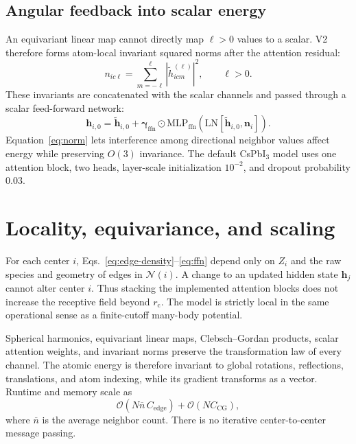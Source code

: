 \documentclass[10pt]{article}
\newcommand{\calN}{\mathcal{N}}
\newcommand{\vect}[1]{\bm{#1}}
\begin{document}
\subsection{Angular feedback into scalar energy}

An equivariant linear map cannot directly map $\ell>0$ values to a scalar.
V2 therefore forms atom-local invariant squared norms after the attention
residual:
\begin{equation}
 n_{ic\ell}=\sum_{m=-\ell}^{\ell}
 \left|\widetilde h^{(\ell)}_{icm}\right|^2,
 \qquad \ell>0.
 \label{eq:norm}
\end{equation}
These invariants are concatenated with the scalar channels and passed through a
scalar feed-forward network:
\begin{equation}
 \vect h_{i,0}=\widetilde{\vect h}_{i,0}
 +\vect\gamma_{\mathrm{ffn}}\odot
 \mathrm{MLP}_{\mathrm{ffn}}
 \!\left(\mathrm{LN}[\widetilde{\vect h}_{i,0},\vect n_i]\right).
 \label{eq:ffn}
\end{equation}
Equation~\eqref{eq:norm} lets interference among directional neighbor values
affect energy while preserving $O(3)$ invariance. The default CsPbI$_3$ model
uses one attention block, two heads, layer-scale initialization $10^{-2}$, and
dropout probability $0.03$.

\section{Locality, equivariance, and scaling}

For each center $i$, Eqs.~\eqref{eq:edge-density}--\eqref{eq:ffn} depend only on
$Z_i$ and the raw species and geometry of edges in $\calN(i)$. A change to an
updated hidden state $\vect h_j$ cannot alter center $i$. Thus stacking the
implemented attention blocks does not increase the receptive field beyond
$r_{\mathrm c}$. The model is strictly local in the same operational sense as a
finite-cutoff many-body potential.

Spherical harmonics, equivariant linear maps, Clebsch--Gordan products, scalar
attention weights, and invariant norms preserve the transformation law of every
channel. The atomic energy is therefore invariant to global rotations,
reflections, translations, and atom indexing, while its gradient transforms as
a vector. Runtime and memory scale as
\begin{equation}
 \mathcal O(N\overline n\,C_{\mathrm{edge}})+\mathcal O(NC_{\mathrm{CG}}),
\end{equation}
where $\overline n$ is the average neighbor count. There is no iterative
center-to-center message passing.
\end{document}
